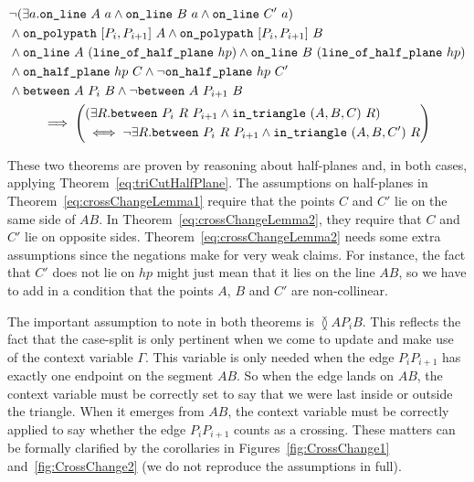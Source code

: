 \begin{multline}\label{eq:crossChangeLemma2}
  \begin{aligned}
    &\neg(\exists a.\texttt{on\_line}\ A\ a\wedge \texttt{on\_line}\ B\ a\wedge \texttt{on\_line}\ C'\ a)\\
    &\wedge \texttt{on\_polypath}\ [P_i, P_{i+1}]\ A \wedge \texttt{on\_polypath}\ [P_i, P_{i+1}]\ B\\
    &\wedge\texttt{on\_line}\ A\ (\texttt{line\_of\_half\_plane}\ hp) \wedge \texttt{on\_line}\ B\ (\texttt{line\_of\_half\_plane}\ hp)\\
    &\wedge\texttt{on\_half\_plane}\ hp\ C \wedge \neg\texttt{on\_half\_plane}\ hp\ C'\\
    &\wedge \texttt{between}\ A\ P_i\ B \wedge \neg\texttt{between}\ A\ P_{i+1}\ B
  \end{aligned}\\
  \implies\left(\begin{aligned}
      &(\exists R. \texttt{between}\ P_i\ R\ P_{i+1} \wedge \texttt{in\_triangle}\ (A,B,C)\ R)\\
      &\iff\neg \exists R. \texttt{between}\ P_i\ R\ P_{i+1} \wedge \texttt{in\_triangle}\ (A,B,C')\ R
  \end{aligned}\right)
\end{multline}

These two theorems are proven by reasoning about half-planes and, in both cases, applying Theorem~\ref{eq:triCutHalfPlane}. The assumptions on half-planes in Theorem~\ref{eq:crossChangeLemma1} require that the points $C$ and $C'$ lie on the same side of $AB$. In Theorem~\ref{eq:crossChangeLemma2}, they require that $C$ and $C'$ lie on opposite sides. Theorem~\ref{eq:crossChangeLemma2} needs some extra assumptions since the negations make for very weak claims. For instance, the fact that $C'$ does not lie on $hp$ might just mean that it lies on the line $AB$, so we have to add in a condition that the points $A$, $B$ and $C'$ are non-collinear.

The important assumption to note in both theorems is $\between{A}{P_i}{B}$. This reflects the fact that the case-split is only pertinent when we come to update and make use of the context variable $\Gamma$. This variable is only needed when the edge $P_iP_{i+1}$ has exactly one endpoint on the segment $AB$. So when the edge lands on $AB$, the context variable must be correctly set to say that we were last inside or outside the triangle. When it emerges from $AB$, the context variable must be correctly applied to say whether the edge $P_iP_{i+1}$ counts as a crossing. These matters can be formally clarified by the corollaries in Figures~\ref{fig:CrossChange1} and~\ref{fig:CrossChange2} (we do not reproduce the assumptions in full).

